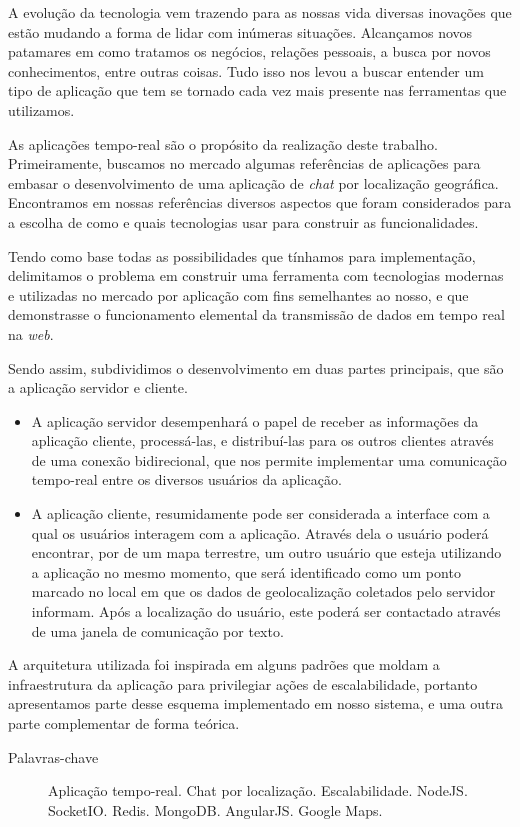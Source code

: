 \documentclass[brazil,ruledheader]{abntifes}
\begin{document}
	\begin{resumo}
		A evolução da tecnologia vem trazendo para as nossas vida diversas inovações que estão mudando a forma de lidar com inúmeras situações. Alcançamos novos patamares em como tratamos os negócios, relações pessoais, a busca por novos conhecimentos, entre outras coisas. Tudo isso nos levou a buscar entender um tipo de aplicação que tem se tornado cada vez mais presente nas ferramentas que utilizamos.
		
		As aplicações tempo-real são o propósito da realização deste trabalho. Primeiramente, buscamos no mercado algumas referências de aplicações para embasar o desenvolvimento de uma aplicação de \textit{chat} por localização geográfica. Encontramos em nossas referências diversos aspectos que foram considerados para a escolha de como e 
		quais tecnologias usar para construir as funcionalidades.
		
		Tendo como base todas as possibilidades que tínhamos para implementação, delimitamos o problema em construir uma ferramenta com tecnologias modernas e utilizadas no mercado por aplicação com fins semelhantes ao nosso, e que demonstrasse o funcionamento elemental da transmissão de dados em tempo real na \textit{web}.
		
		Sendo assim, subdividimos o desenvolvimento em duas partes principais, que são a aplicação servidor e cliente. 
		
		\begin{itemize}
			\item A aplicação servidor desempenhará o papel de receber as informações da aplicação cliente, processá-las, e distribuí-las para os outros clientes através de uma conexão bidirecional, que nos permite implementar uma comunicação tempo-real entre os diversos usuários da aplicação.
		\end{itemize}
		
		\begin{itemize}
			\item  A aplicação cliente, resumidamente pode ser considerada a interface com a qual os usuários interagem com a aplicação. Através dela o usuário poderá encontrar, por de um mapa terrestre, um outro usuário que esteja utilizando a aplicação no mesmo momento, que será identificado como um ponto marcado no local em que os dados de geolocalização coletados pelo servidor informam. Após a localização do usuário, este poderá ser contactado através de uma janela de comunicação por texto.
		\end{itemize}
		
		A arquitetura utilizada foi inspirada em alguns padrões que moldam a infraestrutura da aplicação para privilegiar ações de escalabilidade, portanto apresentamos parte desse esquema implementado em nosso sistema, e uma outra parte complementar de forma teórica.
		
		\begin{description}
			\item[Palavras-chave] Aplicação tempo-real. Chat por localização. Escalabilidade. NodeJS. SocketIO. Redis. MongoDB. AngularJS. Google Maps.
		\end{description}
		
	\end{resumo}
	
\end{document}
